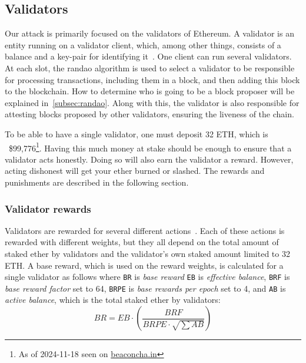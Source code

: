 \subsection{Validators}\label{subsec:validator}
Our attack is primarily focused on the validators of Ethereum.
A validator is an entity running on a validator client,
which, among other things, consists of a balance and a key-pair for identifying it~\cite{Staking}.
One client can run several validators.
At each slot, the \gls{randao} algorithm is used to select a validator to be responsible for processing transactions,
including them in a block,
and then adding this block to the blockchain.
How to determine who is going to be a block proposer will be explained in~\autoref{subsec:randao}.
Along with this, the validator is also responsible for attesting blocks proposed by other validators,
ensuring the liveness of the chain.

To be able to have a single validator, one must deposit 32 ETH,
which is ~\$99,776\footnote{As of 2024-11-18 seen on \href{https://beaconcha.in/}{beaconcha.in}}.
Having this much money at stake should be enough to ensure that a validator acts honestly.
Doing so will also earn the validator a reward.
However, acting dishonest will get your ether burned or slashed.
The rewards and punishments are described in the following section.
\subsubsection{Validator rewards}\label{subsubsec:valrewards}
Validators are rewarded for several different actions~\cite{PoSRewAndPen}.
Each of these actions is rewarded with different weights,
but they all depend on the total amount of staked ether by validators and the validator's own staked amount limited to 32 ETH\@.
A base reward, which is used on the reward weights, is calculated for a single validator as follows where \texttt{BR} is \textit{base reward} \texttt{EB} is \textit{effective balance}, \texttt{BRF} is \textit{base reward factor} set to 64,
\texttt{BRPE} is \textit{base rewards per epoch} set to 4,
and \texttt{AB} is \textit{active balance}, which is the total staked ether by validators:
\begin{equation}
    BR = EB\cdot(\frac{BRF}{BRPE\cdot \sqrt{\sum{AB}}})
    \label{eq:basereward}
\end{equation}


